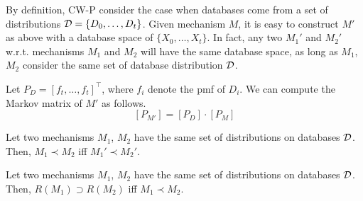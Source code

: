 \documentclass[11pt]{article}
\begin{document}
By definition, CW-P consider the case when databases come from a set of distributions ${\cal D}=\{D_{0}, \dots, D_{t}\}$. Given mechanism $M$, it is easy to construct $M'$ as above with a database space of $\{X_{0} , \dots, X_{t} \}$. In fact, any two $M_{1}'$ and $M_{2}'$ w.r.t. mechanisms $M_{1}$ and $M_{2}$ will have the same database space, as long as $M_{1}$, $M_{2}$ consider the same set of database distribution $\cal D$. 

Let $P_{D}= [f_{t}, \dots, f_{t}]^{\top}$, where $f_{i}$ denote the pmf of $D_{i}$. We can compute the Markov matrix of $M'$ as follows.
\[
[P_{M'}] = [P_{D}] \cdot [P_{M}]
\]
\begin{lemma}
Let two mechanisms $M_{1}$, $M_{2}$ have the same set of distributions on databases $\cal D$. Then, $M_{1} \prec M_{2}$ iff $M_{1}' \prec M_{2}'$.
\end{lemma}
\begin{theorem}
Let two mechanisms $M_{1}$, $M_{2}$ have the same set of distributions on databases $\cal D$. Then, $R(M_{1}) \supset R(M_{2})$ iff $M_{1} \prec M_{2}$.
\end{theorem}
\end{document}
